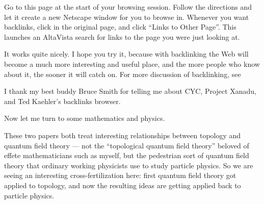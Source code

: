 \documentclass{article}
\def\tightlist{}
\renewcommand{\texttt}[1]{%
  \begingroup
  \ttfamily
  \begingroup\lccode`~=`/\lowercase{\endgroup\def~}{/\discretionary{}{}{}}%
  \begingroup\lccode`~=`[\lowercase{\endgroup\def~}{[\discretionary{}{}{}}%
  \begingroup\lccode`~=`.\lowercase{\endgroup\def~}{.\discretionary{}{}{}}%
  \catcode`/=\active\catcode`[=\active\catcode`.=\active
  \scantokens{#1\noexpand}%
  \endgroup
}
\begin{document}

Go to this page at the start of your browsing session. Follow the
directions and let it create a new Netscape window for you to browse in.
Whenever you want backlinks, click in the original page, and click
``Links to Other Page''. This launches an AltaVista search for links to
the page you were just looking at.

It works quite nicely. I hope you try it, because with backlinking the
Web will become a much more interesting and useful place, and the more
people who know about it, the sooner it will catch on. For more
discussion of backlinking, see


I thank my best buddy Bruce Smith for telling me about CYC, Project
Xanadu, and Ted Kaehler's backlinks browser.

Now let me turn to some mathematics and physics.


These two papers both treat interesting relationships between topology
and quantum field theory --- not the ``topological quantum field
theory'' beloved of effete mathematicians such as myself, but the
pedestrian sort of quantum field theory that ordinary working physicists
use to study particle physics. So we are seeing an interesting
cross-fertilization here: first quantum field theory got applied to
topology, and now the resulting ideas are getting applied back to
particle physics.
\end{document}
